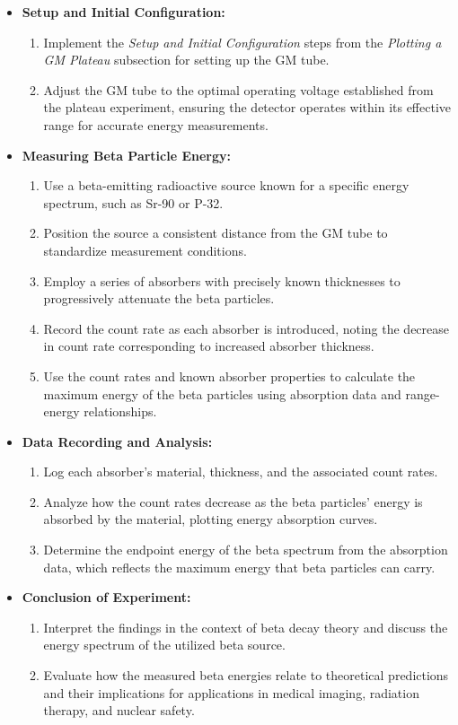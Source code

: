 \documentclass[11pt]{article}
\begin{document}
	\begin{itemize}
		\item \textbf{Setup and Initial Configuration:}
		\begin{enumerate}
			\item Implement the \textit{Setup and Initial Configuration} steps from the \textit{Plotting a GM Plateau} subsection for setting up the GM tube.
			\item Adjust the GM tube to the optimal operating voltage established from the plateau experiment, ensuring the detector operates within its effective range for accurate energy measurements.
		\end{enumerate}
		
		\item \textbf{Measuring Beta Particle Energy:}
		\begin{enumerate}
			\item Use a beta-emitting radioactive source known for a specific energy spectrum, such as Sr-90 or P-32.
			\item Position the source a consistent distance from the GM tube to standardize measurement conditions.
			\item Employ a series of absorbers with precisely known thicknesses to progressively attenuate the beta particles.
			\item Record the count rate as each absorber is introduced, noting the decrease in count rate corresponding to increased absorber thickness.
			\item Use the count rates and known absorber properties to calculate the maximum energy of the beta particles using absorption data and range-energy relationships.
		\end{enumerate}
		
		\item \textbf{Data Recording and Analysis:}
		\begin{enumerate}
			\item Log each absorber's material, thickness, and the associated count rates.
			\item Analyze how the count rates decrease as the beta particles' energy is absorbed by the material, plotting energy absorption curves.
			\item Determine the endpoint energy of the beta spectrum from the absorption data, which reflects the maximum energy that beta particles can carry.
		\end{enumerate}
		
		\item \textbf{Conclusion of Experiment:}
		\begin{enumerate}
			\item Interpret the findings in the context of beta decay theory and discuss the energy spectrum of the utilized beta source.
			\item Evaluate how the measured beta energies relate to theoretical predictions and their implications for applications in medical imaging, radiation therapy, and nuclear safety.
		\end{enumerate}
	\end{itemize}
\end{document}
